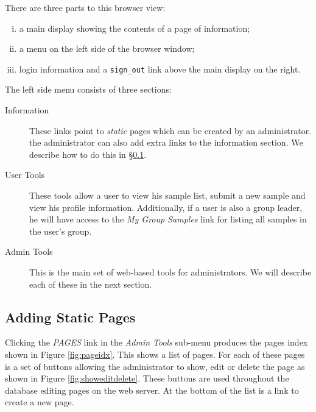 \documentclass[12pt,twoside]{article}
\begin{document}
There are three parts to this browser view:
\begin{enumerate}[(i)]
\item
a main display showing the contents of a page of information;
\item
a menu on the left side of the browser window;
\item
login information and a \verb=sign_out= link above the main display on
the right.
\end{enumerate}

The left side menu consists of three sections:
\begin{description}
\item[Information]
These links point to \emph{static} pages which can be created by an
administrator. the administrator can also add extra links to the
information section. We describe how to do this in \S\ref{sec:static}.
\item[User Tools]
These tools allow a user to view his sample list, submit a new sample
and view his profile information. Additionally, if a user is also a group
leader, he will have access to the \emph{My Group Samples} link for listing
all samples in the user's group.
\item[Admin Tools]
This is the main set of web-based tools for administrators. We will
describe each of these in the next section.
\end{description}
\subsection{Adding Static Pages}\label{sec:static}

Clicking the \emph{PAGES} link in the \emph{Admin Tools} sub-menu 
produces the pages index shown in Figure \ref{fig:pageidx}.
This shows a list of pages. For each of these pages is a set of buttons
allowing the administrator to show, edit or delete the page as shown in
Figure \ref{fig:showeditdelete}.
These buttons are used throughout the database editing pages on the web server.
At the bottom of the list is a link to create a new page.
\end{document}

